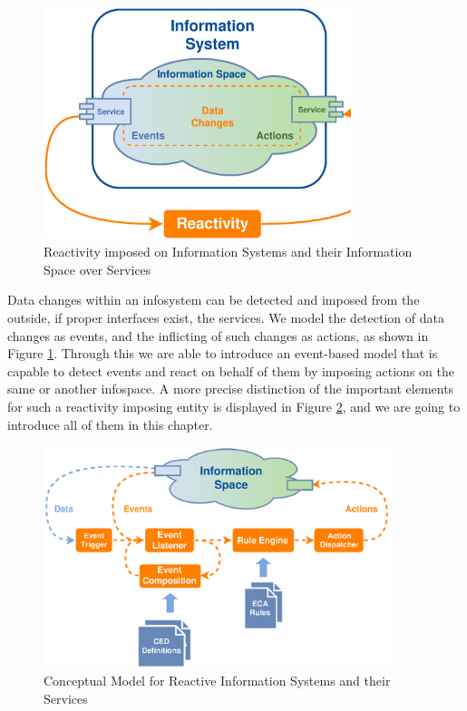 \begin{figure}[!ht]
  \centering
  \includegraphics[width=0.8\textwidth]{figures/IS_InformationSpace}
  \caption{Reactivity imposed on Information Systems and their Information Space over Services}
  \label{fig:IS_InformationSpace}
\end{figure}
Data changes within an \textrm{\gls{infosystem}} can be detected and imposed from the outside, if proper interfaces exist, the services.
We model the detection of data changes as events, and the inflicting of such changes as actions, as shown in Figure \ref{fig:IS_InformationSpace}.
Through this we are able to introduce an event-based model that is capable to detect events and react on behalf of them by imposing actions on the same or another \textrm{\gls{infospace}}.
A more precise distinction of the important elements for such a reactivity imposing entity is displayed in Figure \ref{fig:Standard-Model-Template}, and we are going to introduce all of them in this chapter.
\begin{figure}[!ht]
  \centering
  \includegraphics[width=0.9\textwidth]{figures/Standard-Model-Template}
  \caption{Conceptual Model for Reactive Information Systems and their Services}
  \label{fig:Standard-Model-Template}
\end{figure}



